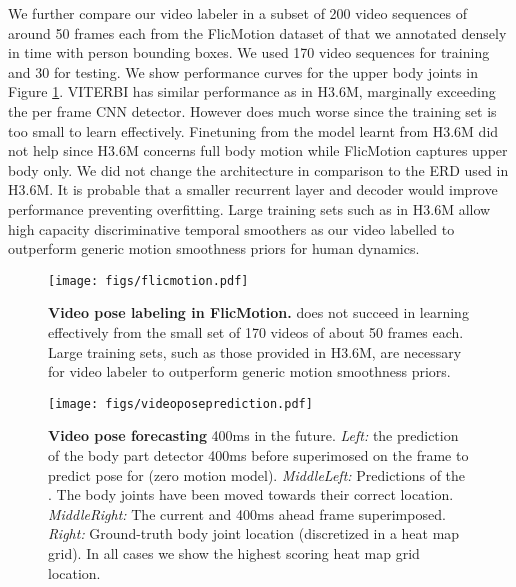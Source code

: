 \documentclass[10pt,twocolumn,letterpaper]{article}
\begin{document}
We further compare our video labeler in a subset of 200 video sequences of around 50 frames each from the FlicMotion dataset of \cite{DBLP:conf/accv/JainTLB14,MODEC} that we annotated  densely in time with person bounding boxes. We used 170 video sequences for training and 30 for testing. We show performance curves for the upper body joints in Figure \ref{fig:flic}. VITERBI has similar performance as in H3.6M, marginally exceeding the per frame CNN detector. However  does much worse since the training set is too small to learn effectively. Finetuning from the model learnt from H3.6M did not help since H3.6M concerns full body motion while FlicMotion captures upper body only.   We did not change the architecture in comparison to the ERD used in H3.6M. It is probable that a smaller recurrent layer and decoder would improve performance preventing overfitting. Large training sets such as in H3.6M allow high capacity discriminative temporal smoothers as our video labelled  to outperform generic motion smoothness priors  for human dynamics. 

\begin{figure}[ht]
\begin{center}
\texttt{[image: figs/flicmotion.pdf]}
\end{center}
\caption{\textbf{Video pose labeling in FlicMotion.} 
 does not succeed in learning effectively from the small set of 170 videos of about 50 frames each. Large training sets, such as those provided in H3.6M, are necessary for  video labeler to outperform generic motion smoothness priors. }
\label{fig:flic}
\end{figure}


\begin{figure}[ht]
 \begin{center}
 \texttt{[image: figs/videoposeprediction.pdf]}
 \end{center}
\caption{\textbf{Video pose forecasting}  400ms in the future. \textit{Left:} the prediction of the body part detector 400ms before superimosed on the frame to predict pose for (zero motion model). \textit{MiddleLeft:} Predictions of the . The body joints have been moved towards their correct location. \textit{MiddleRight:} The current and 400ms ahead frame superimposed. \textit{Right:} Ground-truth body joint location (discretized in a  heat map grid). In all cases we show the highest scoring heat map grid location. }
 \label{fig:videoprediction}
 \end{figure}
\end{document}

